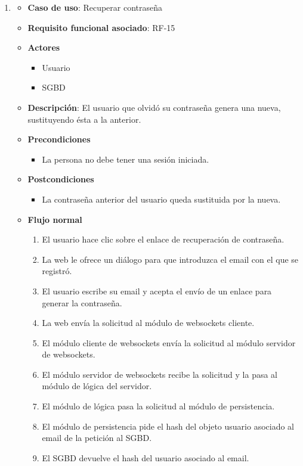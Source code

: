 \begin{enumerate}
\item %
  \begin{itemize}
  \item \textbf{Caso de uso}: Recuperar contraseña
  \item \textbf{Requisito funcional asociado}: RF-15
  \item \textbf{Actores}
    \begin{itemize}
    \item Usuario
    \item SGBD
    \end{itemize}
  \item \textbf{Descripción}: El usuario que olvidó su contraseña genera una nueva, sustituyendo ésta a la anterior.
  \item \textbf{Precondiciones}
    \begin{itemize}
    \item La persona no debe tener una sesión iniciada.
    \end{itemize}
  \item \textbf{Postcondiciones}
    \begin{itemize}
    \item La contraseña anterior del usuario queda sustituida por la nueva.
    \end{itemize}
  \item \textbf{Flujo normal}
    \begin{enumerate}
    \item El usuario hace clic sobre el enlace de recuperación de contraseña.
    \item La web le ofrece un diálogo para que introduzca el email con el que se registró.
    \item El usuario escribe su email y acepta el envío de un enlace para generar la contraseña.
    \item La web envía la solicitud al módulo de websockets cliente.
    \item El módulo cliente de websockets envía la solicitud al módulo servidor de websockets.
    \item El módulo servidor de websockets recibe la solicitud y la pasa al módulo de lógica del servidor.
    \item El módulo de lógica pasa la solicitud al módulo de persistencia.
    \item El módulo de persistencia pide el hash del objeto usuario asociado al email de la petición al SGBD.
    \item El SGBD devuelve el hash del usuario asociado al email.

\end{enumerate}
\end{itemize}
\end{enumerate}
